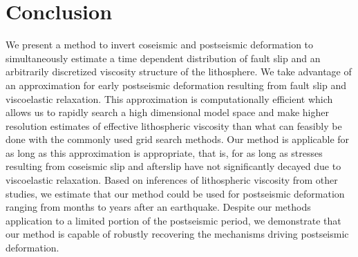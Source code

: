 \documentclass[extra,mreferee]{gji}
\begin{document}
\section{Conclusion}
We present a method to invert coseismic and postseismic deformation to
simultaneously estimate a time dependent distribution of fault slip
and an arbitrarily discretized viscosity structure of the lithosphere.
We take advantage of an approximation for early postseismic
deformation resulting from fault slip and viscoelastic relaxation.
This approximation is computationally efficient which allows us to
rapidly search a high dimensional model space and make higher
resolution estimates of effective lithospheric viscosity than what can
feasibly be done with the commonly used grid search methods. Our
method is applicable for as long as this approximation is appropriate,
that is, for as long as stresses resulting from coseismic slip and
afterslip have not significantly decayed due to viscoelastic
relaxation.  Based on inferences of lithospheric viscosity from other
studies, we estimate that our method could be used for postseismic
deformation ranging from months to years after an earthquake.
Despite our methods application to a limited portion of the
postseismic period, we demonstrate that our method is capable of
robustly recovering the mechanisms driving postseismic deformation.

\appendix
\end{document}
